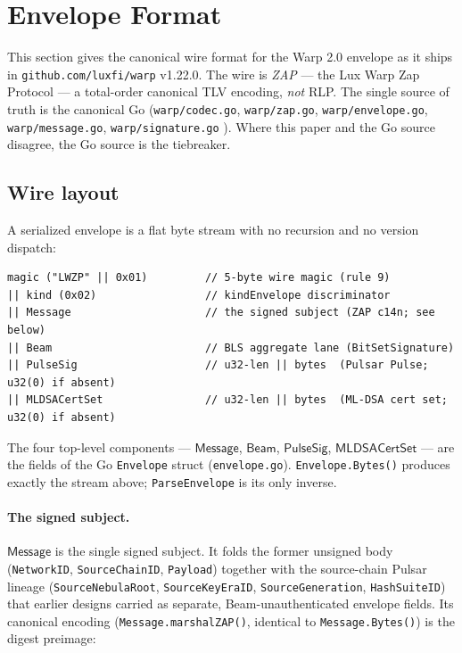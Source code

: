 \section{Envelope Format}
\label{sec:envelope-format}

This section gives the canonical wire format for the Warp 2.0 envelope as it ships in \texttt{github.com/luxfi/warp} v1.22.0. The wire is \emph{ZAP} --- the Lux Warp Zap Protocol --- a total-order canonical TLV encoding, \emph{not} RLP. The single source of truth is the canonical Go (\texttt{warp/codec.go}, \texttt{warp/zap.go}, \texttt{warp/envelope.go}, \texttt{warp/message.go}, \texttt{warp/signature.go} \cite{warpgo}). Where this paper and the Go source disagree, the Go source is the tiebreaker.

\subsection{Wire layout}

A serialized envelope is a flat byte stream with no recursion and no version dispatch:

\begin{verbatim}
magic ("LWZP" || 0x01)         // 5-byte wire magic (rule 9)
|| kind (0x02)                 // kindEnvelope discriminator
|| Message                     // the signed subject (ZAP c14n; see below)
|| Beam                        // BLS aggregate lane (BitSetSignature)
|| PulseSig                    // u32-len || bytes  (Pulsar Pulse; u32(0) if absent)
|| MLDSACertSet                // u32-len || bytes  (ML-DSA cert set; u32(0) if absent)
\end{verbatim}

The four top-level components --- $\mathsf{Message}$, $\mathsf{Beam}$, $\mathsf{PulseSig}$, $\mathsf{MLDSACertSet}$ --- are the fields of the Go \texttt{Envelope} struct (\texttt{envelope.go}). \texttt{Envelope.Bytes()} produces exactly the stream above; \texttt{ParseEnvelope} is its only inverse.

\paragraph{The signed subject.} $\mathsf{Message}$ is the single signed subject. It folds the former unsigned body (\texttt{NetworkID}, \texttt{SourceChainID}, \texttt{Payload}) together with the source-chain Pulsar lineage (\texttt{SourceNebulaRoot}, \texttt{SourceKeyEraID}, \texttt{SourceGeneration}, \texttt{HashSuiteID}) that earlier designs carried as separate, Beam-unauthenticated envelope fields. Its canonical encoding (\texttt{Message.marshalZAP()}, identical to \texttt{Message.Bytes()}) is the digest preimage:

